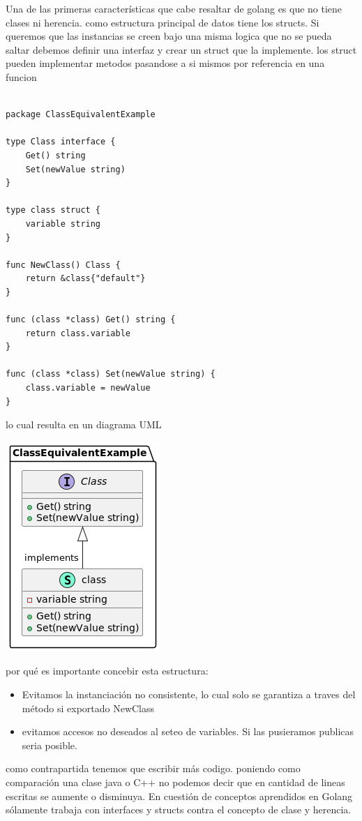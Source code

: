 Una de las primeras características que cabe resaltar de golang es que no tiene clases ni herencia. como estructura
principal de datos tiene los structs. Si queremos que las instancias se creen bajo una misma logica que no se pueda saltar
debemos definir una interfaz y crear un struct que la implemente. los struct pueden implementar metodos pasandose a si mismos por referencia en una funcion

\begin{lstlisting}[label={lst:lstlisting}]

package ClassEquivalentExample

type Class interface {
	Get() string
	Set(newValue string)
}

type class struct {
	variable string
}

func NewClass() Class {
	return &class{"default"}
}

func (class *class) Get() string {
	return class.variable
}

func (class *class) Set(newValue string) {
	class.variable = newValue
}

\end{lstlisting}

lo cual resulta en un diagrama UML

\includegraphics{part/memoria_constructiva/ClassEquivalentInGolang}

por qué es importante concebir esta estructura:

\begin{itemize}
    \item Evitamos la instanciación no consistente, lo cual solo se garantiza a traves del método si exportado NewClass
    \item evitamos accesos no deseados al seteo de variables. Si las pusieramos publicas seria posible.
\end{itemize}

como contrapartida tenemos que escribir más codigo. poniendo como comparación una clase java o C++ no podemos decir que en cantidad de lineas escritas se aumente o disminuya. En cuestión de conceptos aprendidos en Golang sólamente trabaja con interfaces y structs contra el concepto de clase y herencia.


